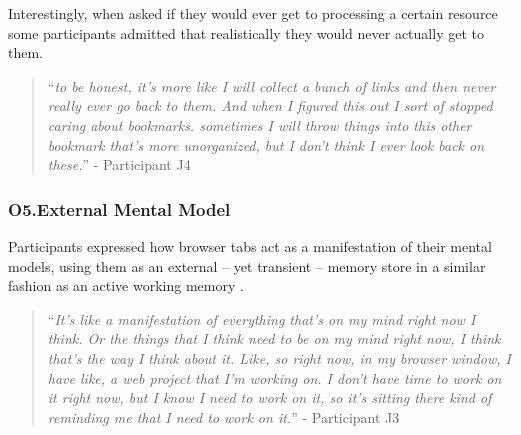 Interestingly, when asked if they would ever get to processing a certain resource some participants admitted that realistically they would never actually get to them.

\begin{quote}
``\emph{to be honest,  it's more like I will collect a bunch of links and then never really ever go back to them. And when I figured this out I sort of stopped caring about bookmarks.  sometimes I will throw things into this other bookmark that's more unorganized,  but I don't think I ever look back on these.}'' - Participant J4
\end{quote}




\subsubsection{O5.External Mental Model}


Participants expressed how browser tabs act as a manifestation of their mental models, using them as an external -- yet transient -- memory store in a similar fashion as an active working memory \cite{baddeley1974working}.

\begin{quote}
``\emph{It's like a manifestation of everything that's on my mind right now I think. Or the things that I think need to be on my mind right now, I think that's the way I think about it. Like, so right now, in my browser window, I have like, a web project that I'm working on. I don't have time to work on it right now, but I know I need to work on it, so it's sitting there kind of reminding me that I need to work on it.}'' - Participant J3
\end{quote}

